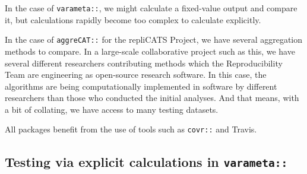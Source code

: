 \documentclass[
]{article}
\begin{document}
In the case of \texttt{varameta::}, we might calculate a fixed-value output and compare it, but calculations rapidly become too complex to calculate explicitly.

In the case of \texttt{aggreCAT::} for the repliCATS Project, we have several aggregation methods to compare. In a large-scale collaborative project such as this, we have several different researchers contributing methods which the Reproducibility Team are engineering as open-source research software. In this case, the algorithms are being computationally implemented in software by different researchers than those who conducted the initial analyses. And that means, with a bit of collating, we have access to many testing datasets.

All packages benefit from the use of tools such as \texttt{covr::} and Travis.

\hypertarget{testing-via-explicit-calculations-in-varameta}{%
\subsection{\texorpdfstring{Testing via explicit calculations in \texttt{varameta::}}{Testing via explicit calculations in varameta::}}\label{testing-via-explicit-calculations-in-varameta}}
\end{document}
